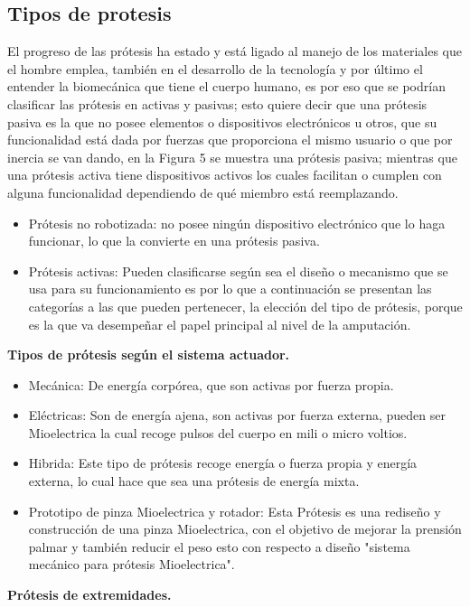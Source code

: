 \documentclass{article}
\begin{document}
\subsection{Tipos de protesis}
El progreso de las prótesis ha estado y está ligado al manejo de los materiales que el hombre emplea, también en el desarrollo de la tecnología y por último el entender la biomecánica que tiene el cuerpo humano, es por eso que se podrían clasificar las prótesis en activas y pasivas; esto quiere decir que una prótesis pasiva es la que no posee elementos o dispositivos electrónicos u otros, que su funcionalidad está dada por fuerzas que proporciona el mismo usuario o que por inercia se van dando, en la Figura 5 se muestra una prótesis pasiva; mientras que una prótesis activa tiene dispositivos activos los cuales facilitan o cumplen con alguna funcionalidad dependiendo de qué miembro está reemplazando\cite{5}.
\begin{itemize}
\item Prótesis no robotizada: no posee ningún dispositivo electrónico que lo haga funcionar, lo que la convierte en una prótesis pasiva. 
\item Prótesis activas: Pueden clasificarse según sea el diseño o mecanismo que se usa para su funcionamiento es por lo que a continuación se presentan las categorías a las que pueden pertenecer, la elección del tipo de prótesis, porque es la que va desempeñar el papel principal al nivel de la amputación.
\end{itemize}
\textbf{Tipos de prótesis según el sistema actuador.}

\begin{itemize}
\item Mecánica:  De energía corpórea, que son activas por fuerza propia.
\item Eléctricas: Son de energía ajena, son activas por fuerza externa, pueden ser Mioelectrica la cual recoge pulsos del cuerpo en mili o micro voltios.
\item Hibrida: Este tipo de prótesis recoge energía o fuerza propia y energía externa, lo cual hace que sea una prótesis de energía mixta.
\item Prototipo de pinza Mioelectrica y rotador: Esta Prótesis es una rediseño y construcción de una pinza Mioelectrica, con el objetivo de mejorar la prensión palmar y también reducir el peso esto con respecto a diseño "sistema mecánico para prótesis Mioelectrica".
\end{itemize}

\textbf{Prótesis de extremidades.}
\end{document}
